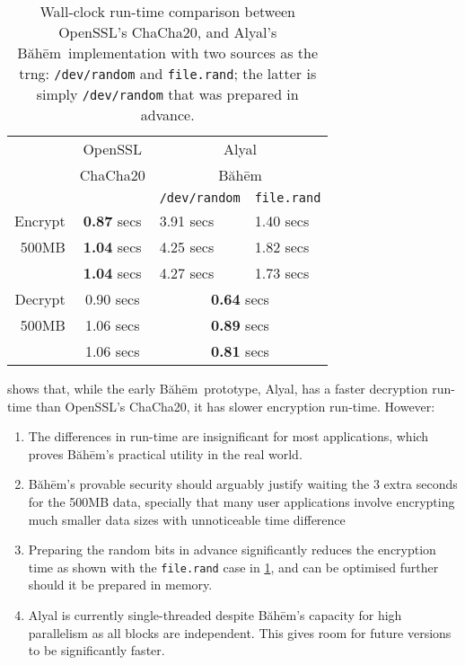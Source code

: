\documentclass[twocolumn,hidelinks]{article}
\newcommand{\baheem}{Băhēm}
\begin{document}
\begin{table}[tbh]
    \centering
    \begin{tabular}{rcll}
                & OpenSSL            & \multicolumn{2}{c}{Alyal}                 \\
                & ChaCha20           & \multicolumn{2}{c}{\baheem}               \\
                &                    & \texttt{/dev/random} & \texttt{file.rand} \\\hline
        Encrypt & \textbf{0.87} secs & 3.91 secs            & 1.40 secs          \\
        500MB   & \textbf{1.04} secs & 4.25 secs            & 1.82 secs          \\
                & \textbf{1.04} secs & 4.27 secs            & 1.73 secs          \\\hline
        Decrypt & 0.90 secs          & \multicolumn{2}{c}{\textbf{0.64} secs}    \\
        500MB   & 1.06 secs          & \multicolumn{2}{c}{\textbf{0.89} secs}    \\
                & 1.06 secs          & \multicolumn{2}{c}{\textbf{0.81} secs}    \\
    \end{tabular}
    \caption{Wall-clock run-time comparison between OpenSSL's ChaCha20, and
    Alyal's \baheem\ implementation with two sources as the \gls{trng}:
    \texttt{/dev/random} and \texttt{file.rand};  the latter is simply
    \texttt{/dev/random} that was prepared in advance.}
    \label{tbl_benchmark}
\end{table}

 shows that, while the early \baheem\ prototype, Alyal,
has a faster decryption run-time than OpenSSL's ChaCha20, it has slower
encryption run-time. However:
\begin{enumerate}
    \item The differences in run-time are insignificant for most
        applications, which proves \baheem's practical utility in the real
        world.
    \item \baheem's provable security should arguably justify waiting the
        $3$ extra seconds for the 500MB data, specially that many user
        applications involve encrypting much smaller data sizes with
        unnoticeable time difference
    \item Preparing the random bits in advance significantly reduces the
        encryption time as shown with the \texttt{file.rand} case in
        \cref{tbl_benchmark}, and can be optimised further should it be
        prepared in memory.
    \item Alyal is currently single-threaded despite \baheem's capacity for
        high parallelism as all blocks are independent. This gives room for
        future versions to be significantly faster.
\end{enumerate}
\end{document}
